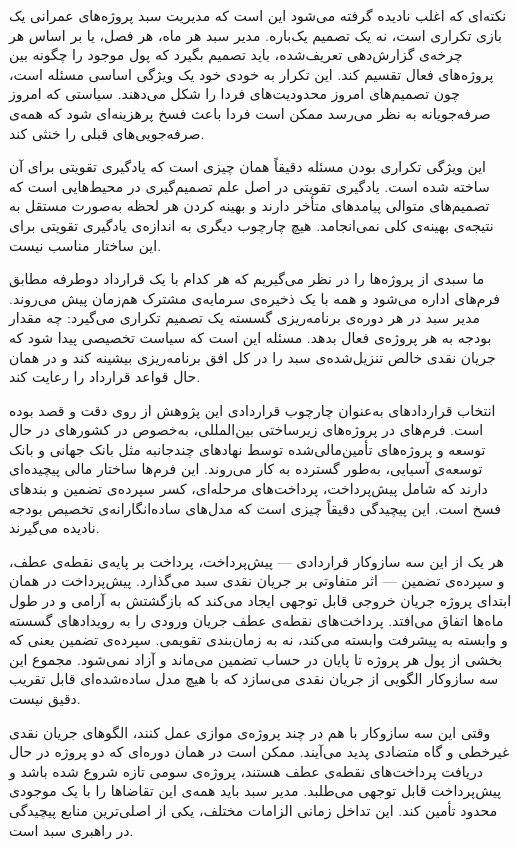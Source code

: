 نکته‌ای که اغلب نادیده گرفته می‌شود این است که مدیریت سبد پروژه‌های
عمرانی یک بازی تکراری است، نه یک تصمیم یک‌باره. مدیر سبد هر ماه،
هر فصل، یا بر اساس هر چرخه‌ی گزارش‌دهی تعریف‌شده، باید تصمیم
بگیرد که پول موجود را چگونه بین پروژه‌های فعال تقسیم کند. این
تکرار به خودی خود یک ویژگی اساسی مسئله است، چون تصمیم‌های امروز
محدودیت‌های فردا را شکل می‌دهند. سیاستی که امروز صرفه‌جویانه
به نظر می‌رسد ممکن است فردا باعث فسخ پرهزینه‌ای شود که همه‌ی
صرفه‌جویی‌های قبلی را خنثی کند.

این ویژگی تکراری بودن مسئله دقیقاً همان چیزی است که یادگیری
تقویتی برای آن ساخته شده است. یادگیری تقویتی در اصل علم
تصمیم‌گیری در محیط‌هایی است که تصمیم‌های متوالی پیامدهای متأخر
دارند و بهینه کردن هر لحظه به‌صورت مستقل به نتیجه‌ی بهینه‌ی
کلی نمی‌انجامد. هیچ چارچوب دیگری به اندازه‌ی یادگیری تقویتی
برای این ساختار مناسب نیست.

ما سبدی از پروژه‌ها را در نظر می‌گیریم که هر کدام با یک قرارداد
دوطرفه مطابق فرم‌های  \citep{FIDIC2017} اداره می‌شود و همه
با یک ذخیره‌ی سرمایه‌ی مشترک هم‌زمان پیش می‌روند.
مدیر سبد در هر دوره‌ی برنامه‌ریزی گسسته یک تصمیم تکراری می‌گیرد:
چه مقدار بودجه به هر پروژه‌ی فعال بدهد.
مسئله این است که سیاست تخصیصی پیدا شود که جریان نقدی خالص
تنزیل‌شده‌ی سبد را در کل افق برنامه‌ریزی بیشینه کند و در همان حال
قواعد قرارداد را رعایت کند.

انتخاب قراردادهای  به‌عنوان چارچوب قراردادی این پژوهش از
روی دقت و قصد بوده است. فرم‌های  در پروژه‌های زیرساختی
بین‌المللی، به‌خصوص در کشورهای در حال توسعه و پروژه‌های تأمین‌مالی‌شده
توسط نهادهای چندجانبه مثل بانک جهانی و بانک توسعه‌ی آسیایی، به‌طور
گسترده به کار می‌روند. این فرم‌ها ساختار مالی پیچیده‌ای دارند که
شامل پیش‌پرداخت، پرداخت‌های مرحله‌ای، کسر سپرده‌ی تضمین و بندهای فسخ
است. این پیچیدگی دقیقاً چیزی است که مدل‌های ساده‌انگارانه‌ی تخصیص
بودجه نادیده می‌گیرند.

هر یک از این سه سازوکار قراردادی --- پیش‌پرداخت، پرداخت بر پایه‌ی
نقطه‌ی عطف، و سپرده‌ی تضمین --- اثر متفاوتی بر جریان نقدی سبد
می‌گذارد. پیش‌پرداخت در همان ابتدای پروژه جریان خروجی قابل توجهی
ایجاد می‌کند که بازگشتش به آرامی و در طول ماه‌ها اتفاق می‌افتد.
پرداخت‌های نقطه‌ی عطف جریان ورودی را به رویدادهای گسسته و وابسته به
پیشرفت وابسته می‌کند، نه به زمان‌بندی تقویمی. سپرده‌ی تضمین یعنی
که بخشی از پول هر پروژه تا پایان در حساب تضمین می‌ماند و آزاد نمی‌شود.
مجموع این سه سازوکار الگویی از جریان نقدی می‌سازد که با هیچ مدل
ساده‌شده‌ای قابل تقریب دقیق نیست.

وقتی این سه سازوکار با هم در چند پروژه‌ی موازی عمل کنند، الگوهای
جریان نقدی غیرخطی و گاه متضادی پدید می‌آیند. ممکن است در همان دوره‌ای
که دو پروژه در حال دریافت پرداخت‌های نقطه‌ی عطف هستند، پروژه‌ی سومی
تازه شروع شده باشد و پیش‌پرداخت قابل توجهی می‌طلبد. مدیر سبد باید
همه‌ی این تقاضاها را با یک موجودی محدود تأمین کند. این تداخل
زمانی الزامات مختلف، یکی از اصلی‌ترین منابع پیچیدگی در راهبری
سبد است.

